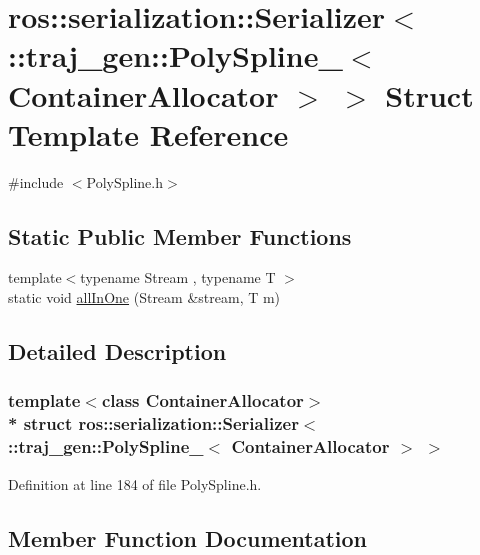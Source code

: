 \hypertarget{structros_1_1serialization_1_1_serializer_3_01_1_1traj__gen_1_1_poly_spline___3_01_container_allocator_01_4_01_4}{}\section{ros\+:\+:serialization\+:\+:Serializer$<$ \+:\+:traj\+\_\+gen\+:\+:Poly\+Spline\+\_\+$<$ Container\+Allocator $>$ $>$ Struct Template Reference}
\label{structros_1_1serialization_1_1_serializer_3_01_1_1traj__gen_1_1_poly_spline___3_01_container_allocator_01_4_01_4}


{\ttfamily \#include $<$Poly\+Spline.\+h$>$}

\subsection*{Static Public Member Functions}
\begin{DoxyCompactItemize}
\item 
{\footnotesize template$<$typename Stream , typename T $>$ }\\static void \hyperlink{structros_1_1serialization_1_1_serializer_3_01_1_1traj__gen_1_1_poly_spline___3_01_container_allocator_01_4_01_4_a19626d8dafc245161c9f771e520bcf59}{all\+In\+One} (Stream \&stream, T m)
\end{DoxyCompactItemize}


\subsection{Detailed Description}
\subsubsection*{template$<$class Container\+Allocator$>$\\*
struct ros\+::serialization\+::\+Serializer$<$ \+::traj\+\_\+gen\+::\+Poly\+Spline\+\_\+$<$ Container\+Allocator $>$ $>$}



Definition at line 184 of file Poly\+Spline.\+h.



\subsection{Member Function Documentation}
